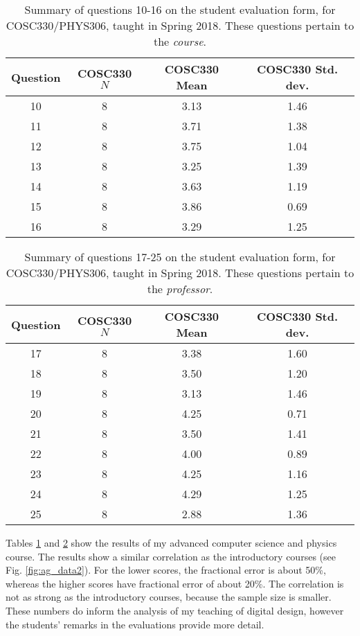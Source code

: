 \documentclass[../../main.tex]{subfiles}
\begin{document}
\begin{table}
\small
\centering
\begin{tabular}{| c | c | c | c |}
\hline \hline
Question & COSC330 $N$ & COSC330 Mean & COSC330 Std. dev. \\ \hline
10 & 8 & 3.13 & 1.46 \\ \hline
11 & 8 & 3.71 & 1.38 \\ \hline
12 & 8 & 3.75 & 1.04 \\ \hline
13 & 8 & 3.25 & 1.39 \\ \hline
14 & 8 & 3.63 & 1.19 \\ \hline
15 & 8 & 3.86 & 0.69 \\ \hline
16 & 8 & 3.29 & 1.25 \\ \hline
\hline
\end{tabular}
\caption{\label{tab:courses:adv_eval_1} Summary of questions 10-16 on the student evaluation form, for COSC330/PHYS306, taught in Spring 2018.  These questions pertain to the \textit{course}.}
\end{table}

\begin{table}
\centering
\begin{tabular}{| c | c | c | c |}
\hline \hline
Question & COSC330 $N$ & COSC330 Mean & COSC330 Std. dev. \\ \hline
17 & 8 & 3.38 & 1.60 \\ \hline
18 & 8 & 3.50 & 1.20 \\ \hline
19 & 8 & 3.13 & 1.46 \\ \hline
20 & 8 & 4.25 & 0.71 \\ \hline
21 & 8 & 3.50 & 1.41 \\ \hline
22 & 8 & 4.00 & 0.89 \\ \hline
23 & 8 & 4.25 & 1.16 \\ \hline
24 & 8 & 4.29 & 1.25 \\ \hline
25 & 8 & 2.88 & 1.36 \\ \hline
\hline
\end{tabular}
\caption{\label{tab:courses:adv_eval_2} Summary of questions 17-25 on the student evaluation form, for COSC330/PHYS306, taught in Spring 2018.  These questions pertain to the \textit{professor}.}
\end{table}

Tables \ref{tab:courses:adv_eval_1} and \ref{tab:courses:adv_eval_2} show the results of my advanced computer science and physics course.  The results show a similar correlation as the introductory courses (see Fig. \ref{fig:ag_data2}).   For the lower scores, the fractional error is about 50\%, whereas the higher scores have fractional error of about 20\%.  The correlation is not as strong as the introductory courses, because the sample size is smaller. These numbers do inform the analysis of my teaching of digital design, however the students' remarks in the evaluations provide more detail. \\ \hspace{0.1cm}
\end{document}
